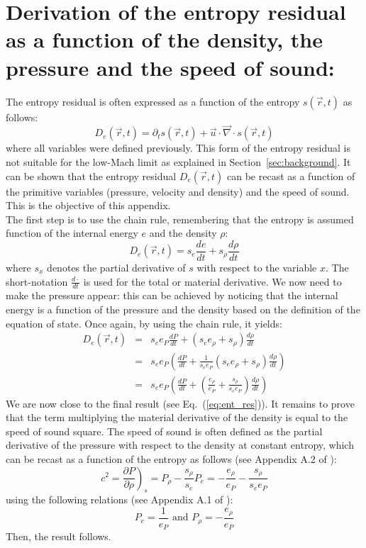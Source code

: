 \documentclass[preprint,10pt]{elsarticle}
\renewcommand{\div}{\vec{\nabla}\! \cdot \!}
\newcommand{\eqt}[1]{Eq.~(\ref{#1})}                     %
\newcommand{\sct}[1]{Section~\ref{#1}}                   %
\begin{document}
\section{Derivation of the entropy residual as a function of the density, the pressure and the speed of sound:} \label{app:ent_res}
The entropy residual is often expressed as a function of the entropy $s(\vec{r},t)$ as follows:
\begin{equation}
D_e(\vec{r},t) = \partial_t s (\vec{r},t) + \vec{u} \cdot \div s (\vec{r},t) \nonumber
\end{equation}
where all variables were defined previously. This form of the entropy residual is not suitable for the low-Mach limit as explained in \sct{sec:background}. It can be shown that the entropy residual $D_e(\vec{r},t)$ can be recast as a function of the primitive variables (pressure, velocity and density) and the speed of sound. This is the objective of this appendix. \\
The first step is to use the chain rule, remembering that the entropy is assumed function of the internal energy $e$ and the density $\rho$:
\begin{equation}
D_e(\vec{r},t) = s_e \frac{d e}{dt} + s_{\rho} \frac{d \rho}{dt} \nonumber
\end{equation}
where $s_x$ denotes the partial derivative of $s$ with respect to the variable $x$. The short-notation $\frac{d \cdot}{dt}$ is used for the total or material derivative. We now need to make the pressure appear: this can be achieved by noticing that the internal energy is a function of the pressure and the density based on the definition of the equation of state. Once again, by using the chain rule, it yields:
\begin{eqnarray}
D_e(\vec{r},t) &=&  s_e e_P \frac{d P}{dt} + ( s_e e_{\rho} + s_{\rho} ) \frac{d \rho}{dt} \nonumber \\
&=& s_e e_P \left( \frac{d P}{dt} + \frac{1}{s_e e_P} ( s_e e_{\rho} + s_{\rho} ) \frac{d \rho}{dt} \right) \nonumber \\
&=& s_e e_P \left( \frac{d P}{dt} + ( \frac{e_{\rho}}{e_P} + \frac{s_{\rho}}{s_e e_P} ) \frac{d \rho}{dt} \right) \nonumber 
\end{eqnarray}
We are now close to the final result (see \eqt{eq:ent_res}). It remains to prove that the term multiplying the material derivative of the density is equal to the speed of sound square. The speed of sound is often defined as the partial derivative of the pressure with respect to the density at constant entropy, which can be recast as a function of the entropy as follows (see Appendix A.2 of \cite{jlg}):
\begin{equation}
c^2 = \left. \frac{\partial P}{\partial \rho} \right)_s = P_{\rho} - \frac{s_{\rho}}{s_e} P_e = - \frac{e_{\rho}}{e_P} - \frac{s_{\rho}}{s_e e_P} \nonumber
\end{equation}
using the following relations (see Appendix A.1 of \cite{jlg}):
\begin{equation}
P_e = \frac{1}{e_P} \text{ and } P_{\rho} = -\frac{e_{\rho}}{e_P} \nonumber
\end{equation}
Then, the result follows.
\newpage
\end{document}
